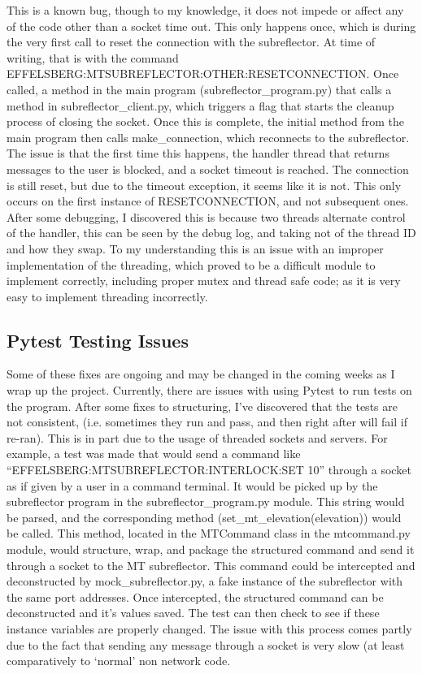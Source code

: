 \documentclass{article}
\begin{document}
This is a known bug, though to my knowledge, it does not impede or affect any of the code other than a socket time out. This only happens once, which is during the very first call to reset the connection with the subreflector. At time of writing, that is with the command EFFELSBERG:MTSUBREFLECTOR:OTHER:RESETCONNECTION. Once called, a method in the main program (subreflector\_program.py) that 
calls a method in subreflector\_client.py, which triggers a flag that starts the cleanup process of closing the socket. Once this is complete, the initial method from the main program then calls make\_connection, which reconnects to the subreflector. The issue is that the first time this happens, the handler thread that returns messages to the user is blocked, and a socket timeout is reached. The connection is still reset, but due to the timeout exception, it seems like it is not. This only occurs on the first instance of RESETCONNECTION, and not subsequent ones. After some debugging, I discovered this is because two threads alternate control of the handler, this can be seen by the debug log, and taking not of the thread ID and how they swap. To my understanding this is an issue with an improper implementation of the threading, which proved to be a difficult module to implement correctly, including proper mutex and thread safe code; as it is very easy to implement threading incorrectly.

\subsection{Pytest Testing Issues}

Some of these fixes are ongoing and may be changed in the coming weeks as I wrap up the project. Currently, there are issues with using Pytest to run tests on the program. After some fixes to structuring, I've discovered that the tests are not consistent, (i.e. sometimes they run and pass, and then right after will fail if re-ran). This is in part due to the usage of threaded sockets and servers. For example, a test was made that would send a command like ``EFFELSBERG:MTSUBREFLECTOR:INTERLOCK:SET 10''  through a socket as if given by a user in a command terminal. It would be picked up by the subreflector program in the subreflector\_program.py module. This string would be parsed, and the corresponding method (set\_mt\_elevation(elevation)) would be called. This method, located in the MTCommand class in the mtcommand.py module, would structure, wrap, and package the structured command and send it through a socket to the MT subreflector. This command could be intercepted and deconstructed by mock\_subreflector.py, a fake instance of the subreflector with the same port addresses. Once intercepted, the structured command can be deconstructed and it's values saved. The test can then check to see if these instance variables are properly changed. The issue with this process comes partly due to the fact that sending any message through a socket is very slow (at least comparatively to `normal' non network code. 
\end{document}
